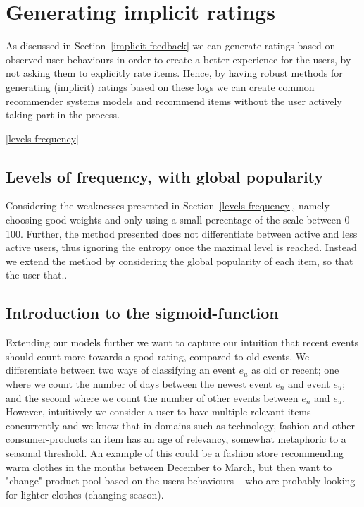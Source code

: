 
\section{Generating implicit ratings}

As discussed in Section~\ref{implicit-feedback} we can generate ratings based
on observed user behaviours in order to create a better experience for the
users, by not asking them to explicitly rate items. Hence, by having robust
methods for generating (implicit) ratings based on these logs we can create
common recommender systems models and recommend items without the user actively
taking part in the process.

\ref{levels-frequency}
\subsection{Levels of frequency, with global popularity}

Considering the weaknesses presented in Section~\ref{levels-frequency}, namely
choosing good weights and only using a small percentage of the scale between
0-100. Further, the method presented does not differentiate between active and
less active users, thus ignoring the entropy once the maximal level is reached.
Instead we extend the method by considering the global popularity of each item,
so that the user that.. 

\subsection{Introduction to the sigmoid-function}

Extending our models further we want to capture our intuition that recent
events should count more towards a good rating, compared to old events. We
differentiate between two ways of classifying an event $e_u$ as old or recent;
one where we count the number of days between the newest event $e_n$ and event
$e_u$; and the second where we count the number of other events between $e_n$
and $e_u$. However, intuitively we consider a user to have multiple relevant
items concurrently and we know that in domains such as technology, fashion and
other consumer-products an item has an age of relevancy, somewhat metaphoric to
a seasonal threshold. An example of this could be a fashion store recommending
warm clothes in the months between December to March, but then want to "change"
product pool based on the users behaviours – who are probably looking for
lighter clothes (changing season).

